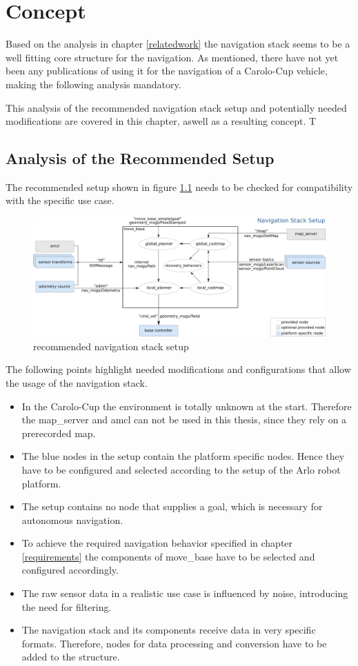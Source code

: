 \chapter{Concept}
\label{Concept}


Based on the analysis in chapter \ref{relatedwork} the navigation stack seems to be a well fitting core structure for the navigation. As mentioned, there have not yet been any publications of using it for the navigation of a Carolo-Cup vehicle, making the following analysis mandatory. 

This analysis of the recommended navigation stack setup and potentially needed modifications are covered in this chapter, aswell as a resulting concept.
T
\section{Analysis of the Recommended Setup}
The recommended setup shown in figure \ref{recnavsetup} needs to be checked for compatibility with the specific use case.

\begin{figure}[H]
	\includegraphics[width=\textwidth]{Pictures/navigation stack setup}
	\caption{recommended navigation stack setup}
	\label{recnavsetup}
\end{figure}

The following points highlight needed modifications and configurations that allow the usage of the navigation stack.

\begin{itemize}
	\item In the Carolo-Cup the environment is totally unknown at the start. Therefore the map\_server and amcl can not be used in this thesis, since they rely on a prerecorded map.
	\item The blue nodes in the setup contain the platform specific nodes. Hence they have to be configured and selected according to the setup of the Arlo robot platform.
	\item The setup contains no node that supplies a goal, which is necessary for autonomous navigation.
	\item To achieve the required navigation behavior specified in chapter \ref{requirements} the components of move\_base have to be selected and configured accordingly.
	\item The raw sensor data in a realistic use case is influenced by noise, introducing the need for filtering.
	\item The navigation stack and its components receive data in very specific formats. Therefore, nodes for data processing and conversion have to be added to the structure.
\end{itemize}

